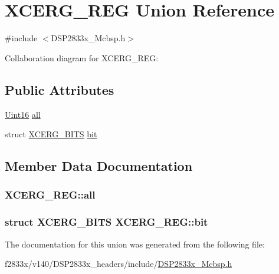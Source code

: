 \hypertarget{union_x_c_e_r_g___r_e_g}{}\section{X\+C\+E\+R\+G\+\_\+\+R\+E\+G Union Reference}
\label{union_x_c_e_r_g___r_e_g}


{\ttfamily \#include $<$D\+S\+P2833x\+\_\+\+Mcbsp.\+h$>$}



Collaboration diagram for X\+C\+E\+R\+G\+\_\+\+R\+E\+G\+:
\subsection*{Public Attributes}
\begin{DoxyCompactItemize}
\item 
\hyperlink{_d_s_p2833x___device_8h_a59a9f6be4562c327cbfb4f7e8e18f08b}{Uint16} \hyperlink{union_x_c_e_r_g___r_e_g_a8983c46c2cfa15746ed0dc7cb5f509c0}{all}
\item 
struct \hyperlink{struct_x_c_e_r_g___b_i_t_s}{X\+C\+E\+R\+G\+\_\+\+B\+I\+T\+S} \hyperlink{union_x_c_e_r_g___r_e_g_a212a8789273caa66979151c45f091f49}{bit}
\end{DoxyCompactItemize}


\subsection{Member Data Documentation}
\hypertarget{union_x_c_e_r_g___r_e_g_a8983c46c2cfa15746ed0dc7cb5f509c0}{}
\subsubsection[{all}]{ X\+C\+E\+R\+G\+\_\+\+R\+E\+G\+::all}\label{union_x_c_e_r_g___r_e_g_a8983c46c2cfa15746ed0dc7cb5f509c0}
\hypertarget{union_x_c_e_r_g___r_e_g_a212a8789273caa66979151c45f091f49}{}
\subsubsection[{bit}]{\setlength{\rightskip}{0pt plus 5cm}struct {\bf X\+C\+E\+R\+G\+\_\+\+B\+I\+T\+S} X\+C\+E\+R\+G\+\_\+\+R\+E\+G\+::bit}\label{union_x_c_e_r_g___r_e_g_a212a8789273caa66979151c45f091f49}


The documentation for this union was generated from the following file\+:\begin{DoxyCompactItemize}
\item 
f2833x/v140/\+D\+S\+P2833x\+\_\+headers/include/\hyperlink{_d_s_p2833x___mcbsp_8h}{D\+S\+P2833x\+\_\+\+Mcbsp.\+h}\end{DoxyCompactItemize}

